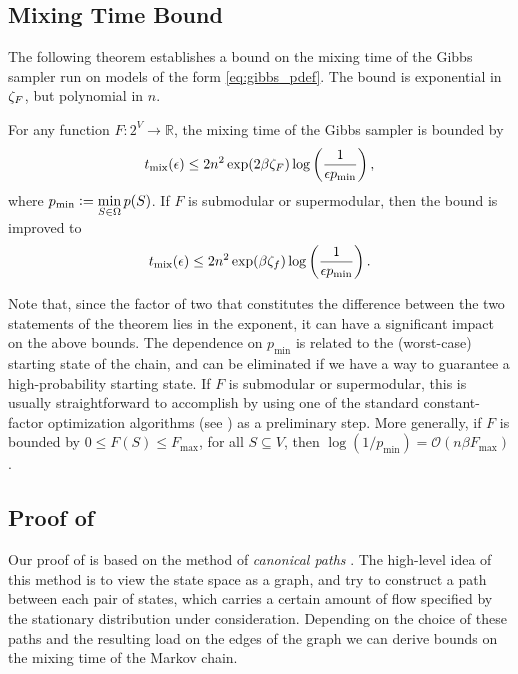 \subsection{Mixing Time Bound}
\noindent The following theorem establishes a bound on the mixing time of the Gibbs sampler run on models of the form \eqref{eq:gibbs_pdef}.
The bound is exponential in $\zeta_F$, but polynomial in $n$.
\begin{theorem} \label{thm:poly}
  For any function $F : 2^V \to \mathbb{R}$, the mixing time of the Gibbs sampler is bounded by
  \begin{align*}
    t_{\mathrm{mix}}(\epsilon) \leq 2n^2 \exp(2 \beta \zeta_F) \log\left(\frac{1}{\epsilon p_{\min}}\right),
  \end{align*}
  where $p_{\min} \vcentcolon= \displaystyle\min_{S \in \Omega}p(S)$.
  If $F$ is submodular or supermodular, then the bound is improved to
  \begin{align*}
    t_{\mathrm{mix}}(\epsilon) \leq 2n^2 \exp(\beta \zeta_f) \log\left(\frac{1}{\epsilon p_{\min}}\right).
  \end{align*}
\end{theorem}
Note that, since the factor of two that constitutes the difference between the two statements of the theorem lies in the exponent, it can have a significant impact on the above bounds.
The dependence on $p_{\min}$ is related to the (worst-case) starting state of the chain, and can be eliminated if we have a way to guarantee a high-probability starting state.
If $F$ is submodular or supermodular, this is usually straightforward to accomplish by using one of the standard constant-factor optimization algorithms (see ) as a preliminary step.
More generally, if $F$ is bounded by $0 \leq F(S) \leq F_{\max}$, for all $S \subseteq V$, then $\log (1/p_{\min}) = \mathcal{O}(n \beta F_{\max})$.

\subsection{Proof of }
Our proof of  is based on the method of \emph{canonical paths} \citep{jerrum03,sinclair92,jerrum89,diaconis91}.
The high-level idea of this method is to view the state space as a graph, and try to construct a path between each pair of states, which carries a certain amount of flow specified by the stationary distribution under consideration.
Depending on the choice of these paths and the resulting load on the edges of the graph we can derive bounds on the mixing time of the Markov chain.


